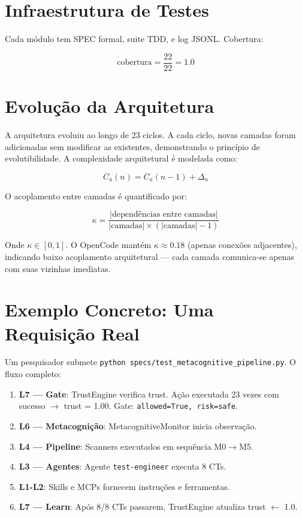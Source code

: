 \section{Infraestrutura de Testes}

Cada módulo tem SPEC formal, suite TDD, e log JSONL. Cobertura:

\begin{equation}
\text{cobertura} = \frac{22}{22} = 1.0
\label{eq:coverage}
\end{equation}

\section{Evolução da Arquitetura}

A arquitetura evoluiu ao longo de 23 ciclos. A cada ciclo, novas camadas foram adicionadas sem modificar as existentes, demonstrando o princípio de evolutibilidade. A complexidade arquitetural é modelada como:

\begin{equation}
C_a(n) = C_a(n-1) + \Delta_n
\label{eq:arch_evolution}
\end{equation}

O acoplamento entre camadas é quantificado por:

\begin{equation}
\kappa = \frac{|\text{dependências entre camadas}|}{|\text{camadas}| \times (|\text{camadas}| - 1)}
\label{eq:acoplamento}
\end{equation}

Onde $\kappa \in [0,1]$. O OpenCode mantém $\kappa \approx 0.18$ (apenas conexões adjacentes), indicando baixo acoplamento arquitetural — cada camada comunica-se apenas com suas vizinhas imediatas.

\section{Exemplo Concreto: Uma Requisição Real}

Um pesquisador submete \texttt{python specs/test\_metacognitive\_pipeline.py}. O fluxo completo:

\begin{enumerate}
    \item \textbf{L7 — Gate}: TrustEngine verifica trust. Ação executada 23 vezes com sucesso $\rightarrow$ trust = 1.00. Gate: \texttt{allowed=True, risk=safe}.
    \item \textbf{L6 — Metacognição}: MetacognitiveMonitor inicia observação.
    \item \textbf{L4 — Pipeline}: Scanners executados em sequência M0$\rightarrow$M5.
    \item \textbf{L3 — Agentes}: Agente \texttt{test-engineer} executa 8 CTs.
    \item \textbf{L1-L2}: Skills e MCPs fornecem instruções e ferramentas.
    \item \textbf{L7 — Learn}: Após 8/8 CTs passarem, TrustEngine atualiza trust $\leftarrow$ 1.0.
\end{enumerate}

